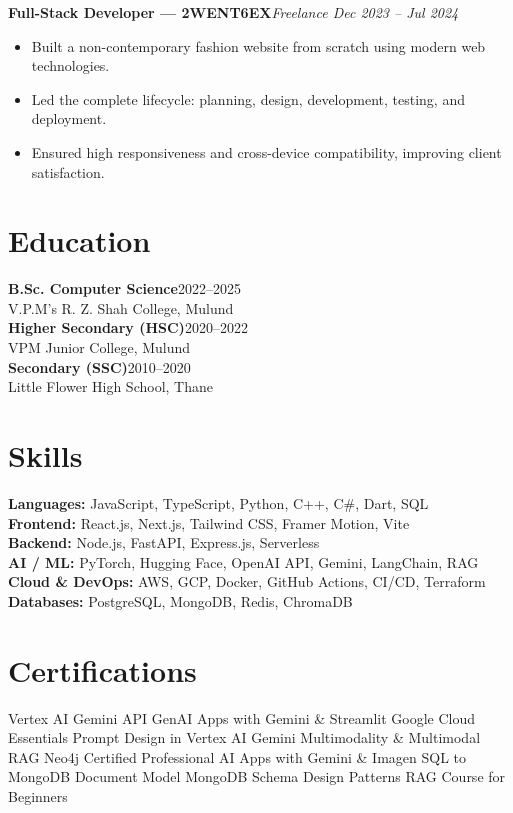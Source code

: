 \documentclass[a4paper,10pt]{article}
\newcommand{\entry}[2]{%
    \textbf{#1}\hfill{\small\color{faint}\textit{#2}}\par%
}
\begin{document}
\entry{Full-Stack Developer --- 2WENT6EX}{Freelance \textbullet{} Dec 2023 -- Jul 2024}
\begin{itemize}
    \item Built a non-contemporary fashion website from scratch using modern web technologies.
    \item Led the complete lifecycle: planning, design, development, testing, and deployment.
    \item Ensured high responsiveness and cross-device compatibility, improving client satisfaction.
\end{itemize}

\vspace{2pt}
\noindent
\begin{minipage}[t]{0.40\textwidth}
    \section*{Education}
    \textbf{B.Sc. Computer Science}\hfill{\small\color{faint}2022--2025}\\
    {\color{soft}\small V.P.M's R. Z. Shah College, Mulund}\\[3pt]
    \textbf{Higher Secondary (HSC)}\hfill{\small\color{faint}2020--2022}\\
    {\color{soft}\small VPM Junior College, Mulund}\\[3pt]
    \textbf{Secondary (SSC)}\hfill{\small\color{faint}2010--2020}\\
    {\color{soft}\small Little Flower High School, Thane}
\end{minipage}\hfill
\begin{minipage}[t]{0.56\textwidth}
    \section*{Skills}
    \textbf{Languages:} JavaScript, TypeScript, Python, C++, C\#, Dart, SQL\\
    \textbf{Frontend:} React.js, Next.js, Tailwind CSS, Framer Motion, Vite\\
    \textbf{Backend:} Node.js, FastAPI, Express.js, Serverless\\
    \textbf{AI / ML:} PyTorch, Hugging Face, OpenAI API, Gemini, LangChain, RAG\\
    \textbf{Cloud \& DevOps:} AWS, GCP, Docker, GitHub Actions, CI/CD, Terraform\\
    \textbf{Databases:} PostgreSQL, MongoDB, Redis, ChromaDB
\end{minipage}

\section*{Certifications}
Vertex AI Gemini API \textbullet{} GenAI Apps with Gemini \& Streamlit \textbullet{} Google Cloud Essentials
\textbullet{} Prompt Design in Vertex AI \textbullet{} Gemini Multimodality \& Multimodal RAG \textbullet{}
Neo4j Certified Professional \textbullet{} AI Apps with Gemini \& Imagen \textbullet{} SQL to MongoDB
Document Model \textbullet{} MongoDB Schema Design Patterns \textbullet{} RAG Course for Beginners
\end{document}
